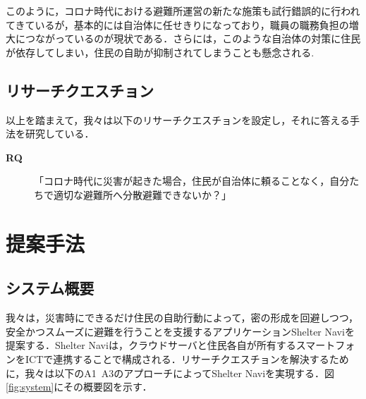 \documentclass[technicalreport,dvipdfmx]{ieicej}
\begin{document}
このように，コロナ時代における避難所運営の新たな施策も試行錯誤的に行われてきているが，基本的には自治体に任せきりになっており，職員の職務負担の増大につながっているのが現状である．さらには，このような自治体の対策に住民が依存してしまい，住民の自助が抑制されてしまうことも懸念される. 

\subsection{リサーチクエスチョン}
以上を踏まえて，我々は以下のリサーチクエスチョンを設定し，それに答える手法を研究している．
\\
\begin{description}
     \item[\textbf{RQ}]「コロナ時代に災害が起きた場合，住民が自治体に頼ることなく，自分たちで適切な避難所へ分散避難できないか？」
\end{description}

\section{提案手法}
\subsection{システム概要}
我々は，災害時にできるだけ住民の自助行動によって，密の形成を回避しつつ，安全かつスムーズに避難を行うことを支援するアプリケーションShelter Naviを提案する．Shelter Naviは，クラウドサーバと住民各自が所有するスマートフォンをICTで連携することで構成される．リサーチクエスチョンを解決するために，我々は以下のA1~A3のアプローチによってShelter Naviを実現する．図\ref{fig:system}にその概要図を示す．
\end{document}
